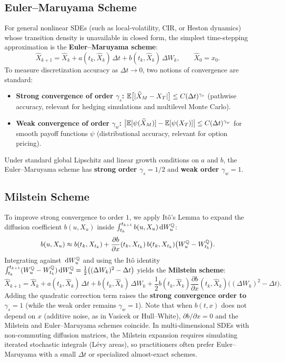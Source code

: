 \subsection*{Euler--Maruyama Scheme}
For general nonlinear SDEs (such as local-volatility, CIR, or Heston dynamics) whose transition density is unavailable in closed form, the simplest time-stepping approximation is the \textbf{Euler--Maruyama scheme}:
\begin{equation}\label{eq:euler-maruyama}
\widehat{X}_{k+1} = \widehat{X}_k + a(t_k, \widehat{X}_k)\,\Delta t + b(t_k, \widehat{X}_k)\,\Delta W_k, \qquad \widehat{X}_0 = x_0.
\end{equation}
To measure discretization accuracy as $\Delta t \to 0$, two notions of convergence are standard:
\begin{itemize}
    \item \textbf{Strong convergence of order $\gamma_s$:} $\mathbb{E}\bigl[|\widehat{X}_M - X_T|\bigr] \leq C(\Delta t)^{\gamma_s}$ (pathwise accuracy, relevant for hedging simulations and multilevel Monte Carlo).
    \item \textbf{Weak convergence of order $\gamma_w$:} $\bigl|\mathbb{E}[\psi(\widehat{X}_M)] - \mathbb{E}[\psi(X_T)]\bigr| \leq C(\Delta t)^{\gamma_w}$ for smooth payoff functions $\psi$ (distributional accuracy, relevant for option pricing).
\end{itemize}
Under standard global Lipschitz and linear growth conditions on $a$ and $b$, the Euler--Maruyama scheme has \textbf{strong order $\gamma_s = 1/2$} and \textbf{weak order $\gamma_w = 1$}.

\subsection*{Milstein Scheme}
To improve strong convergence to order $1$, we apply It\^o's Lemma to expand the diffusion coefficient $b(u, X_u)$ inside $\int_{t_k}^{t_{k+1}} b(u, X_u)\,\mathrm{d} W_u^{\mathbb{Q}}$:
\[
b(u, X_u) \approx b(t_k, X_{t_k}) + \frac{\partial b}{\partial x}(t_k, X_{t_k})\,b(t_k, X_{t_k})\bigl(W_u^{\mathbb{Q}} - W_{t_k}^{\mathbb{Q}}\bigr).
\]
Integrating against $\,\mathrm{d} W_u^{\mathbb{Q}}$ and using the It\^o identity $\int_{t_k}^{t_{k+1}} (W_u^{\mathbb{Q}} - W_{t_k}^{\mathbb{Q}})\,\mathrm{d} W_u^{\mathbb{Q}} = \frac{1}{2}\bigl((\Delta W_k)^2 - \Delta t\bigr)$ yields the \textbf{Milstein scheme}:
\begin{equation}\label{eq:milstein}
\widehat{X}_{k+1} = \widehat{X}_k + a(t_k, \widehat{X}_k)\,\Delta t + b(t_k, \widehat{X}_k)\,\Delta W_k + \frac{1}{2}b(t_k, \widehat{X}_k)\frac{\partial b}{\partial x}(t_k, \widehat{X}_k)\bigl((\Delta W_k)^2 - \Delta t\bigr).
\end{equation}
Adding the quadratic correction term raises the \textbf{strong convergence order to $\gamma_s = 1$} (while the weak order remains $\gamma_w = 1$). Note that when $b(t, x)$ does not depend on $x$ (additive noise, as in Vasicek or Hull--White), $\partial b/\partial x = 0$ and the Milstein and Euler--Maruyama schemes coincide. In multi-dimensional SDEs with non-commuting diffusion matrices, the Milstein expansion requires simulating iterated stochastic integrals (L\'evy areas), so practitioners often prefer Euler--Maruyama with a small $\Delta t$ or specialized almost-exact schemes.

